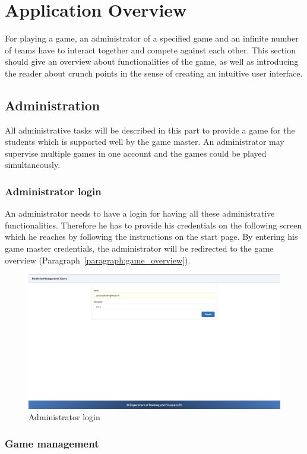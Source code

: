 \section{Application Overview}
For playing a game, an administrator of a specified game and an infinite number of teams have to interact together and compete against each other. This section should give an overview about functionalities of the game, as well as introducing the reader about crunch points in the sense of creating an intuitive user interface.

\subsection{Administration}
All administrative tasks will be described in this part to provide a game for the students which is supported well by the game master. An administrator may supervise multiple games in one account and the games could be played simultaneously.

\subsubsection{Administrator login}
An administrator needs to have a login for having all these administrative functionalities. Therefore he has to provide his credentials on the following screen which he reaches by following the instructions on the start page. By entering his game master credentials, the administrator will be redirected to the game overview (Paragraph~\ref{paragraph:game_overview}).
\begin{figure}[h!]
  \centering
  \includegraphics[scale=0.2]{img/application-overview/administrator/01_login.png}
  \caption{Administrator login}
\end{figure}

\subsubsection{Game management}
